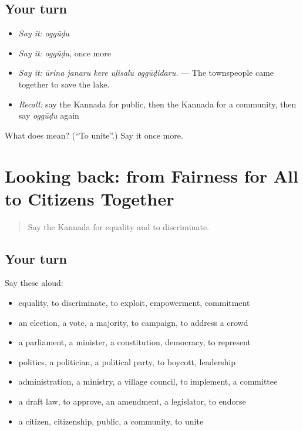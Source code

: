 \subsection*{Your turn}
\begin{itemize}
\raggedright
  \item \emph{Say it:} \emph{oggūḍu}
  \item \emph{Say it:} \emph{oggūḍu}, once more
  \item \emph{Say it:} \emph{ūrina janaru kere uḷisalu oggūḍidaru.} — The townspeople came together to save the lake.
  \item \emph{Recall:} say the Kannada for public, then the Kannada for a community, then say \emph{oggūḍu} again
\end{itemize}

\begin{tcolorbox}[breakable,colback=teal!4,colframe=teal!35!black,title={Before you move on}]
What does  mean? (\textquotedblleft{}To unite\textquotedblright{}.) Say it once more.
\end{tcolorbox}
\section[(dialogue)]{Looking back: from Fairness for All to Citizens Together}

\label{lesson:KA-R397-review-391-397}



\begin{quote}
Say the Kannada for equality and to discriminate.
\end{quote}

\subsection*{Your turn}
Say these aloud:

\begin{itemize}
\raggedright
  \item equality, to discriminate, to exploit, empowerment, commitment
  \item an election, a vote, a majority, to campaign, to address a crowd
  \item a parliament, a minister, a constitution, democracy, to represent
  \item politics, a politician, a political party, to boycott, leadership
  \item administration, a ministry, a village council, to implement, a committee
  \item a draft law, to approve, an amendment, a legislator, to endorse
  \item a citizen, citizenship, public, a community, to unite
\end{itemize}

